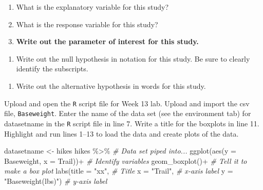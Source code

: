 \documentclass[
]{report}
\newenvironment{Shaded}{\begin{snugshade}}{\end{snugshade}}
\newcommand{\AttributeTok}[1]{\textcolor[rgb]{0.77,0.63,0.00}{#1}}
\newcommand{\CommentTok}[1]{\textcolor[rgb]{0.56,0.35,0.01}{\textit{#1}}}
\newcommand{\FunctionTok}[1]{\textcolor[rgb]{0.00,0.00,0.00}{#1}}
\newcommand{\NormalTok}[1]{#1}
\newcommand{\OtherTok}[1]{\textcolor[rgb]{0.56,0.35,0.01}{#1}}
\newcommand{\SpecialCharTok}[1]{\textcolor[rgb]{0.00,0.00,0.00}{#1}}
\newcommand{\StringTok}[1]{\textcolor[rgb]{0.31,0.60,0.02}{#1}}
\providecommand{\tightlist}{%
  \setlength{\itemsep}{0pt}\setlength{\parskip}{0pt}}
\begin{document}
\begin{enumerate}
\def\labelenumi{\arabic{enumi}.}
\item
  What is the explanatory variable for this study?
  \vspace{0.2in}
\item
  What is the response variable for this study?
  \vspace{0.2in}
\item
  \textbf{Write out the parameter of interest for this study.}
\end{enumerate}

\vspace{0.8in}

\begin{enumerate}
\def\labelenumi{\arabic{enumi}.}
\setcounter{enumi}{3}
\tightlist
\item
  Write out the null hypothesis in notation for this study. Be sure to clearly identify the subscripts.
\end{enumerate}

\vspace{0.5in}

\begin{enumerate}
\def\labelenumi{\arabic{enumi}.}
\setcounter{enumi}{4}
\tightlist
\item
  Write out the alternative hypothesis in words for this study.
\end{enumerate}

\vspace{0.8in}

Upload and open the \texttt{R} script file for Week 13 lab. Upload and import the csv file, \texttt{Baseweight}. Enter the name of the data set (see the environment tab) for datasetname in the \texttt{R} script file in line 7. Write a title for the boxplots in line 11. Highlight and run lines 1--13 to load the data and create plots of the data.

\begin{Shaded}
\begin{Highlighting}[]
\NormalTok{datasetname }\OtherTok{\textless{}{-}}\NormalTok{ hikes }
\NormalTok{hikes }\SpecialCharTok{\%\textgreater{}\%}  \CommentTok{\# Data set piped into...}
  \FunctionTok{ggplot}\NormalTok{(}\FunctionTok{aes}\NormalTok{(}\AttributeTok{y =}\NormalTok{ Baseweight, }\AttributeTok{x =}\NormalTok{ Trail))}\SpecialCharTok{+}  \CommentTok{\# Identify variables}
  \FunctionTok{geom\_boxplot}\NormalTok{()}\SpecialCharTok{+}  \CommentTok{\# Tell it to make a box plot}
  \FunctionTok{labs}\NormalTok{(}\AttributeTok{title =} \StringTok{"xx"}\NormalTok{,  }\CommentTok{\# Title}
       \AttributeTok{x =} \StringTok{"Trail"}\NormalTok{,    }\CommentTok{\# x{-}axis label}
       \AttributeTok{y =} \StringTok{"Baseweight(lbs)"}\NormalTok{)  }\CommentTok{\# y{-}axis label}
\end{Highlighting}
\end{Shaded}
\end{document}
